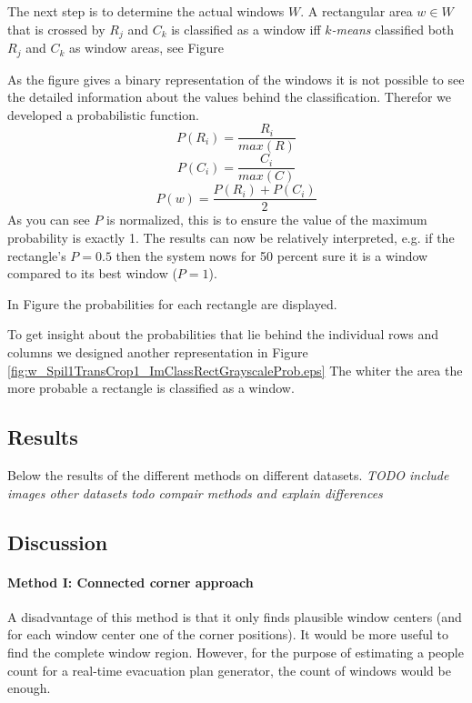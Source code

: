 The next step is to determine the actual windows $W$.
A rectangular area $w\in W$ that is crossed by $R_j$ and $C_k$ is classified as a
window iff \emph{$k$-means} classified both $R_j$ and $C_k$ as window areas, see
Figure %

As the figure gives a binary representation of the windows it is not possible
to see the detailed information about the values behind the classification.
Therefor we developed a probabilistic function. 
\[P(R_i) = \frac{R_i}{max(R)}\]
\[P(C_i) = \frac{C_i}{max(C)}\]
\[P(w) = \frac{P(R_i) + P(C_i)}{2}\]
As you can see $P$ is normalized, this is to ensure the value of the maximum
probability is exactly 1. The results can now be relatively interpreted, e.g. if the rectangle's $P=0.5$
then the system nows for 50 percent sure it is a window compared to its best window ($P=1$).

In Figure %
the probabilities for each rectangle are displayed.

To get insight about the probabilities that lie behind the individual rows and columns
we designed another representation in Figure \ref{fig:w_Spil1TransCrop1_ImClassRectGrayscaleProb.eps}
The whiter the area the more probable a rectangle is classified as a window.




\subsection{Results}
Below the results of the different methods on different datasets.
\emph{TODO include images other datasets}
\emph{todo compair methods and explain differences}


\subsection{Discussion}  %
\paragraph{Method I: Connected corner approach} 
A disadvantage of this method is that it only finds plausible window centers
(and for each window center one of the corner positions).  It would be more
useful to find the complete window region. However, for the purpose of estimating
a people count for a real-time evacuation plan generator, the count of windows
would be enough.


